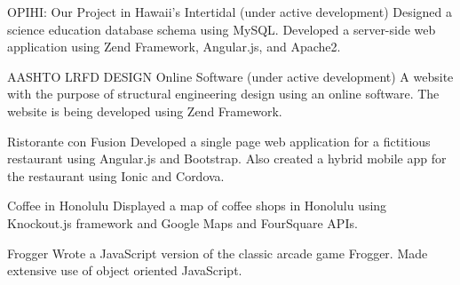\begin{cventries}

	\cventry
	{OPIHI: Our Project in Hawaii's Intertidal (under active development)}
	{}
	{}
	{}
	{Designed a science education database schema using MySQL. Developed a server-side web application using Zend Framework, Angular.js, and Apache2.}
	
	\cventry
	{AASHTO LRFD DESIGN Online Software (under active development)	}
	{}
	{}
	{}
	{A website with the purpose of structural engineering design using an online software. The website is being developed using Zend Framework. }

	\cventry
	{Ristorante con Fusion
	}
	{}
	{}
	{}
	{Developed a single page web application for a fictitious restaurant using Angular.js and Bootstrap.  Also created a hybrid mobile app for the restaurant using Ionic and Cordova.}

	\cventry
	{Coffee in Honolulu
	}
	{}
	{}
	{}
	{Displayed a map of coffee shops in Honolulu using Knockout.js framework and Google Maps and FourSquare APIs.}

	\cventry
	{Frogger
	}
	{}
	{}
	{}
	{Wrote a JavaScript version of the classic arcade game Frogger. Made extensive use of object oriented JavaScript.}



\end{cventries}
